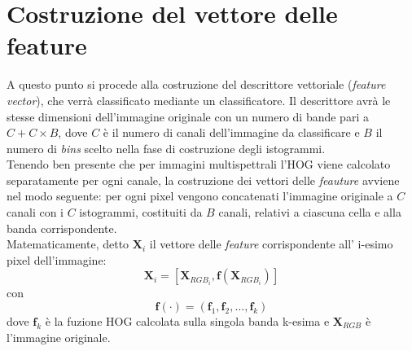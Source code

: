  \section{Costruzione del vettore delle feature}
A questo punto si procede alla costruzione del descrittore vettoriale (\emph{feature vector}), che verrà classificato mediante un classificatore. Il descrittore avrà le stesse dimensioni dell'immagine originale con un numero di bande pari a $C + C\times B$, dove $C$ è il numero di canali dell'immagine da classificare e $B$ il numero di \emph{bins} scelto nella fase di costruzione degli istogrammi.\\
Tenendo ben presente che per immagini multispettrali l'HOG viene calcolato separatamente per ogni canale, la costruzione dei vettori delle \emph{feauture} avviene nel modo seguente: per ogni pixel vengono concatenati l'immagine originale a $C$ canali con i $C$ istogrammi, costituiti da $B$ canali, relativi a ciascuna cella e alla banda corrispondente.\\
Matematicamente, detto $\textbf{X}_{i}$ il vettore delle \emph{feature} corrispondente all' i-esimo pixel dell'immagine:
\begin{equation}
\label{eq:feature_vector}
\textbf{X}_{i}=\left[\textbf{X}_{RGB_{i}}, \textbf{f}(\textbf{X}_{RGB_{i}})\right]
\end{equation}
con \begin{equation}
\label{eq:}
\textbf{f}(\cdot)=(\textbf{f}_1,\textbf{f}_2,\ldots,\textbf{f}_k)
\end{equation}
dove $\textbf{f}_k$ è la fuzione HOG calcolata sulla singola banda k-esima e $\textbf{X}_{RGB}$ è l'immagine originale.
\\
